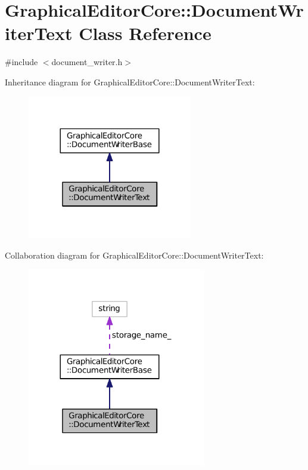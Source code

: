 \hypertarget{classGraphicalEditorCore_1_1DocumentWriterText}{}\section{Graphical\+Editor\+Core\+:\+:Document\+Writer\+Text Class Reference}
\label{classGraphicalEditorCore_1_1DocumentWriterText}


{\ttfamily \#include $<$document\+\_\+writer.\+h$>$}



Inheritance diagram for Graphical\+Editor\+Core\+:\+:Document\+Writer\+Text\+:
\nopagebreak
\begin{figure}[H]
\begin{center}
\leavevmode
\includegraphics[width=204pt]{classGraphicalEditorCore_1_1DocumentWriterText__inherit__graph}
\end{center}
\end{figure}


Collaboration diagram for Graphical\+Editor\+Core\+:\+:Document\+Writer\+Text\+:
\nopagebreak
\begin{figure}[H]
\begin{center}
\leavevmode
\includegraphics[width=221pt]{classGraphicalEditorCore_1_1DocumentWriterText__coll__graph}
\end{center}
\end{figure}
